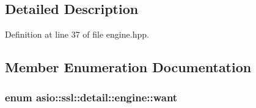 \subsection{Detailed Description}


Definition at line 37 of file engine.\+hpp.



\subsection{Member Enumeration Documentation}
\hypertarget{classasio_1_1ssl_1_1detail_1_1engine_ab9812153941a6a93c9095f4e5ca8f915}{}
\subsubsection[{want}]{\setlength{\rightskip}{0pt plus 5cm}enum {\bf asio\+::ssl\+::detail\+::engine\+::want}}\label{classasio_1_1ssl_1_1detail_1_1engine_ab9812153941a6a93c9095f4e5ca8f915}
